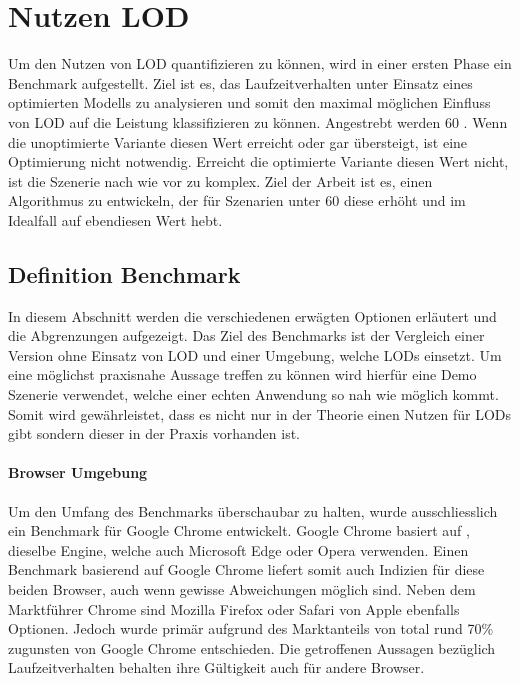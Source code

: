 \section{Nutzen LOD}
Um den Nutzen von LOD quantifizieren zu können, wird in einer ersten Phase ein Benchmark aufgestellt.
Ziel ist es, das Laufzeitverhalten unter Einsatz eines optimierten Modells zu analysieren und somit den maximal möglichen Einfluss von LOD auf die Leistung klassifizieren zu können.
Angestrebt werden 60 . Wenn die unoptimierte Variante diesen Wert erreicht oder gar übersteigt, ist eine Optimierung nicht notwendig. Erreicht die optimierte Variante diesen Wert nicht, ist die Szenerie nach wie vor zu komplex. Ziel der Arbeit ist es, einen Algorithmus zu entwickeln, der für Szenarien unter 60  diese erhöht und im Idealfall auf ebendiesen Wert hebt.

\subsection{Definition Benchmark}
In diesem Abschnitt werden die verschiedenen erwägten Optionen erläutert und die Abgrenzungen aufgezeigt.
Das Ziel des Benchmarks ist der Vergleich einer Version ohne Einsatz von LOD und einer Umgebung, welche LODs einsetzt. Um eine möglichst praxisnahe Aussage treffen zu können wird hierfür eine Demo Szenerie verwendet, welche einer echten Anwendung so nah wie möglich kommt. Somit wird gewährleistet, dass es nicht nur in der Theorie einen Nutzen für LODs gibt sondern dieser in der Praxis vorhanden ist.

\paragraph{Browser Umgebung}
Um den Umfang des Benchmarks überschaubar zu halten, wurde ausschliesslich ein Benchmark für Google Chrome entwickelt.
Google Chrome basiert auf , dieselbe Engine, welche auch Microsoft Edge oder Opera verwenden.
Einen Benchmark basierend auf Google Chrome liefert somit auch Indizien für diese beiden Browser, auch wenn gewisse Abweichungen möglich sind.
Neben dem Marktführer Chrome sind Mozilla Firefox oder Safari von Apple ebenfalls Optionen. Jedoch wurde primär aufgrund des Marktanteils von total rund 70\% \cite{browserUsage} zugunsten von Google Chrome entschieden.
Die getroffenen Aussagen bezüglich Laufzeitverhalten behalten ihre Gültigkeit auch für andere Browser.

